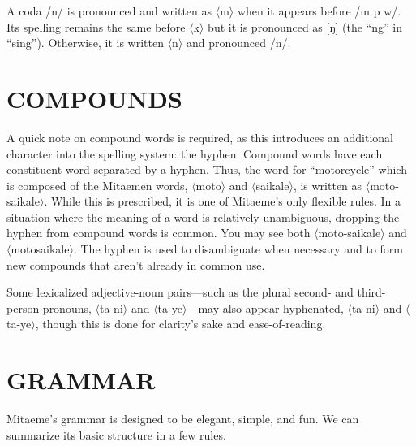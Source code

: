 \documentclass[a4paper, titlepage]{article}
\begin{document}
A coda /n/ is pronounced and written as $\langle$m$\rangle$ when it appears before /m p w/. Its spelling remains the same before $\langle$k$\rangle$ but it is pronounced as [ŋ] (the ``ng'' in ``sing''). Otherwise, it is written $\langle$n$\rangle$ and pronounced /n/.

\section{COMPOUNDS}

A quick note on compound words is required, as this introduces an additional character into the spelling system: the hyphen. Compound words have each constituent word separated by a hyphen. Thus, the word for ``motorcycle'' which is composed of the Mitaemen words, $\langle$moto$\rangle$  and $\langle$saikale$\rangle$, is written as $\langle$moto-saikale$\rangle$. While this is prescribed, it is one of Mitaeme's only flexible rules. In a situation where the meaning of a word is relatively unambiguous, dropping the hyphen from compound words is common. You may see both $\langle$moto-saikale$\rangle$ and $\langle$motosaikale$\rangle$. The hyphen is used to disambiguate when necessary and to form new compounds that aren't already in common use.

Some lexicalized adjective-noun pairs—such as the plural second- and third-person pronouns, $\langle$ta ni$\rangle$ and $\langle$ta ye$\rangle$—may also appear hyphenated,  $\langle$ta-ni$\rangle$ and $\langle$ta-ye$\rangle$, though this is done for clarity's sake and ease-of-reading.

\section{GRAMMAR}

Mitaeme's grammar is designed to be elegant,  simple, and fun. We can summarize its basic structure in a few rules.
\end{document}
